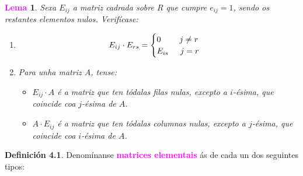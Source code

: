 \documentclass[twoside]{report}
\newcommand{\magbf}[1]{\textcolor{magenta}{\textbf{#1}}} %
\theoremstyle{mystyle}
\newtheorem{lem}{\magbf{Lema}}[chapter]
\newenvironment{lemma}
{\begin{mdframed}[linecolor = magenta,backgroundcolor = classicrose, linewidth = 2mm]\begin{lem}}
{\end{lem}\end{mdframed}}
\begin{document}
\begin{lemma} \label{lem4.1}
Sexa $E_{ij}$ a matriz cadrada sobre $R$ que cumpre $e_{ij} = 1$, sendo os restantes elementos nulos. Verifícase:
\begin{enumerate}
    \item $$E_{ij} \cdot E_{rs} = 
    \begin{cases}
    0 \hspace{8mm} j \neq r\\
    E_{is} \hspace{5mm} j = r
    \end{cases}$$ 
    \item Para unha matriz $A$, tense:
        \begin{itemize}
            \item $E_{ij} \cdot A$ é a matriz que ten tódalas filas nulas, excepto a $i$-ésima, que coincide coa $j$-ésima de $A$.
            \item $A \cdot E_{ij}$ é a matriz que ten tódalas columnas nulas, excepto a $j$-ésima, que coincide coa $i$-ésima de $A$.
        \end{itemize}
\end{enumerate}
\end{lemma}

\vspace{5mm}

\noindent \textbf{Definición 4.1}. Denomínanse \magbf{matrices elementais} ás de cada un dos seguintes tipos:

\renewcommand{\theenumi}{\roman{enumi})}
\renewcommand{\labelenumi}{\theenumi}
\end{document}
